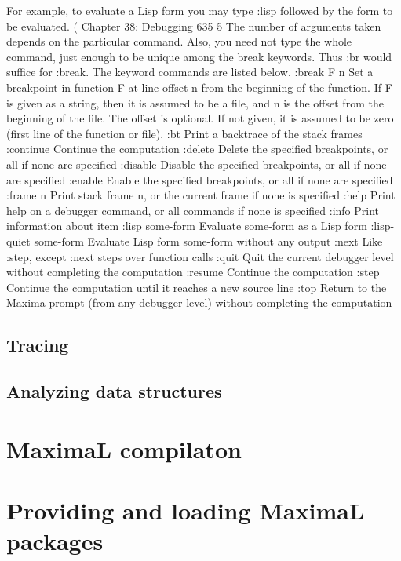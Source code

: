 \documentclass[../Maxima_Workbook.tex]{subfiles}
\begin{document}
\lz For example,
to evaluate a Lisp form you may type :lisp followed by the form to be evaluated.
(%
Chapter 38: Debugging 635
5
The number of arguments taken depends on the particular command. Also, you need
not type the whole command, just enough to be unique among the break keywords. Thus
:br would suffice for :break.
The keyword commands are listed below.
:break F n
Set a breakpoint in function F at line offset n from the beginning of the function.
If F is given as a string, then it is assumed to be a file, and n is the offset from
the beginning of the file. The offset is optional. If not given, it is assumed to
be zero (first line of the function or file).
:bt Print a backtrace of the stack frames
:continue
Continue the computation
:delete Delete the specified breakpoints, or all if none are specified
:disable Disable the specified breakpoints, or all if none are specified
:enable Enable the specified breakpoints, or all if none are specified
:frame n Print stack frame n, or the current frame if none is specified
:help Print help on a debugger command, or all commands if none is specified
:info Print information about item
:lisp some-form
Evaluate some-form as a Lisp form
:lisp-quiet some-form
Evaluate Lisp form some-form without any output
:next Like :step, except :next steps over function calls
:quit Quit the current debugger level without completing the computation
:resume Continue the computation
:step Continue the computation until it reaches a new source line
:top Return to the Maxima prompt (from any debugger level) without completing
the computation

\subsection{Tracing}

\subsection{Analyzing data structures}

\section{MaximaL compilaton}

\section{Providing and loading MaximaL packages}
\end{document}
